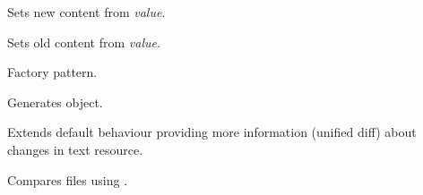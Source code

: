 \documentclass[letterpaper,10pt,english]{sphinxmanual}
\begin{document}
\begin{fulllineitems}
\begin{fulllineitems}
\end{fulllineitems}


\begin{fulllineitems}
\label{index:spy.Site.set_diff}
\end{fulllineitems}


\begin{fulllineitems}
\label{index:spy.Site.set_new_content}
Sets new content from \emph{value}.

\end{fulllineitems}


\begin{fulllineitems}
\label{index:spy.Site.set_old_content}
Sets old content from \emph{value}.

\end{fulllineitems}


\end{fulllineitems}


\begin{fulllineitems}
Factory pattern.

\begin{fulllineitems}
Generates  object.

\end{fulllineitems}


\end{fulllineitems}


\begin{fulllineitems}
Extends default  behaviour providing more information (unified diff)
about changes in text resource.

\begin{fulllineitems}
Compares files using .

\end{fulllineitems}


\end{fulllineitems}
\end{document}
